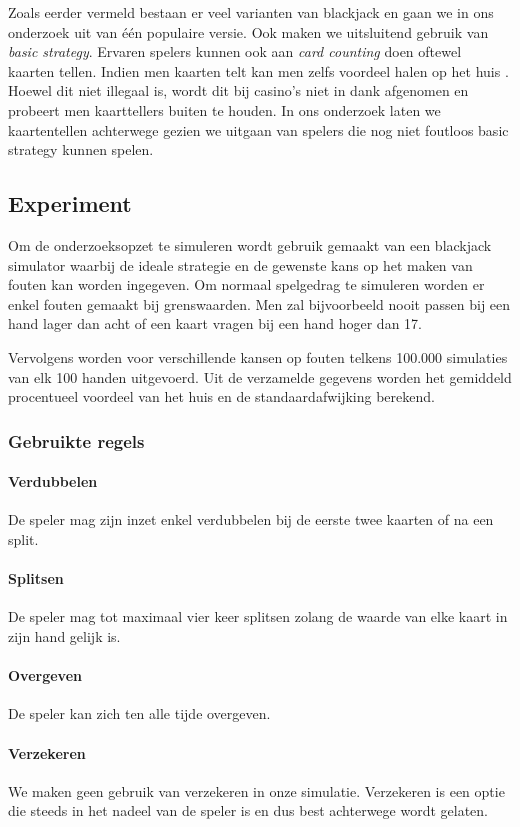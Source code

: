 \documentclass[conference]{IEEEtran}
\begin{document}
Zoals eerder vermeld bestaan er veel varianten van blackjack en gaan we in ons onderzoek uit van \'e\'en populaire versie. Ook maken we uitsluitend gebruik van \textit{basic strategy}. Ervaren spelers kunnen ook aan \textit{card counting} doen oftewel kaarten tellen. Indien men kaarten telt kan men zelfs voordeel halen op het huis \cite{fogel2004evolving}. Hoewel dit niet illegaal is, wordt dit bij casino's niet in dank afgenomen en probeert men kaarttellers buiten te houden. In ons onderzoek laten we kaartentellen achterwege gezien we uitgaan van spelers die nog niet foutloos basic strategy kunnen spelen.

\subsection{Experiment }
Om de onderzoeksopzet te simuleren wordt gebruik gemaakt van een blackjack simulator waarbij de ideale strategie en de gewenste kans op het maken van fouten kan worden ingegeven. Om normaal spelgedrag te simuleren worden er enkel fouten gemaakt bij grenswaarden. Men zal bijvoorbeeld nooit passen bij een hand lager dan acht of een kaart vragen bij een hand hoger dan 17.

Vervolgens worden voor verschillende kansen op fouten telkens 100.000 simulaties van elk 100 handen uitgevoerd. Uit de verzamelde gegevens worden het gemiddeld procentueel voordeel van het huis en de standaardafwijking berekend.

\subsubsection*{Gebruikte regels}
\paragraph{Verdubbelen}
De speler mag zijn inzet enkel verdubbelen bij de eerste twee kaarten of na een split.
\paragraph{Splitsen}
De speler mag tot maximaal vier keer splitsen zolang de waarde van elke kaart in zijn hand gelijk is.
\paragraph{Overgeven}
De speler kan zich ten alle tijde overgeven.
\paragraph{Verzekeren}
We maken geen gebruik van verzekeren in onze simulatie. Verzekeren is een optie die steeds in het nadeel van de speler is en dus best achterwege wordt gelaten. \cite{van1997blackjack}
\end{document}
